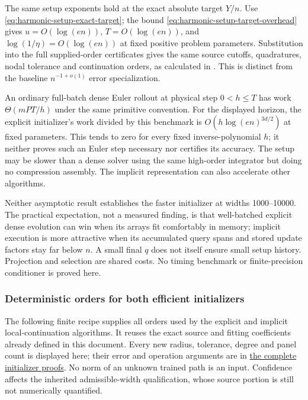 The same setup exponents hold at the exact absolute target \(Y/n\).
Use \eqref{eq:harmonic-setup-exact-target}; the bound
\eqref{eq:harmonic-setup-target-overhead} gives \(u=O(\log(en))\),
\(T=O(\log(en))\), and \(\log(1/\eta)=O(\log(en))\) at fixed
positive problem parameters. Substitution into the full supplied-order
certificates gives the same source cutoffs, quadratures, nodal tolerance
and continuation orders, as calculated in .
This is distinct from the baseline \(n^{-1+o(1)}\) error specialization.



An ordinary full-batch dense Euler rollout at physical step \(0<h\le T\) has work \(\Theta(mPT/h)\) under the same primitive convention. For the displayed horizon, the explicit initializer's work divided by this benchmark is \(O(h\log(en)^{3d/2})\) at fixed parameters. This tends to zero for every fixed inverse-polynomial \(h\); it neither proves such an Euler step necessary nor certifies its accuracy. The setup may be slower than a dense solver using the same high-order integrator but doing no compression assembly. The implicit representation can also accelerate other algorithms.



Neither asymptotic result establishes the faster initializer at widths 1000--10000. The practical expectation, not a measured finding, is that well-batched explicit dense evolution can win when its arrays fit comfortably in memory; implicit execution is more attractive when its accumulated query spans and stored update factors stay far below \(n\). A small final \(q\) does not itself ensure small setup history. Projection and selection are shared costs. No timing benchmark or finite-precision conditioner is proved here.


\subsubsection{Deterministic orders for both efficient initializers}
\label{int:harmonic-efficient-orders}
\label{int:setup-orders}


The following finite recipe supplies all orders used by the explicit and implicit local-continuation algorithms. It reuses the exact source and fitting coefficients already defined in this document. Every new radius, tolerance, degree and panel count is displayed here; their error and operation arguments are in \hyperref[int:efficient-setup-proofs]{the complete initializer proofs}. No norm of an unknown trained path is an input. Confidence affects the inherited admissible-width qualification, whose source portion is still not numerically quantified.


